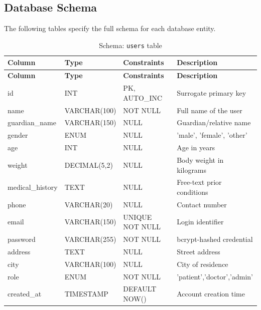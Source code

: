 \subsection{Database Schema}

The following tables specify the full schema for each database entity.

\begin{longtable}{|L{2.8cm}|L{2.6cm}|L{2.2cm}|L{5.2cm}|}
\caption{Schema: \texttt{users} table} \label{tab:users} \\
\hline
\textbf{Column} & \textbf{Type} & \textbf{Constraints} & \textbf{Description} \\
\hline
\endfirsthead
\hline
\textbf{Column} & \textbf{Type} & \textbf{Constraints} & \textbf{Description} \\
\hline
\endhead
\hline
\endfoot
id             & INT              & PK, AUTO\_INC   & Surrogate primary key \\
\hline
name           & VARCHAR(100)     & NOT NULL        & Full name of the user \\
\hline
guardian\_name & VARCHAR(150)     & NULL            & Guardian/relative name \\
\hline
gender         & ENUM             & NULL            & 'male', 'female', 'other' \\
\hline
age            & INT              & NULL            & Age in years \\
\hline
weight         & DECIMAL(5,2)     & NULL            & Body weight in kilograms \\
\hline
medical\_history & TEXT           & NULL            & Free-text prior conditions \\
\hline
phone          & VARCHAR(20)      & NULL            & Contact number \\
\hline
email          & VARCHAR(150)     & UNIQUE NOT NULL & Login identifier \\
\hline
password       & VARCHAR(255)     & NOT NULL        & bcrypt-hashed credential \\
\hline
address        & TEXT             & NULL            & Street address \\
\hline
city           & VARCHAR(100)     & NULL            & City of residence \\
\hline
role           & ENUM             & NOT NULL        & 'patient','doctor','admin' \\
\hline
created\_at    & TIMESTAMP        & DEFAULT NOW()   & Account creation time \\
\hline
\end{longtable}

